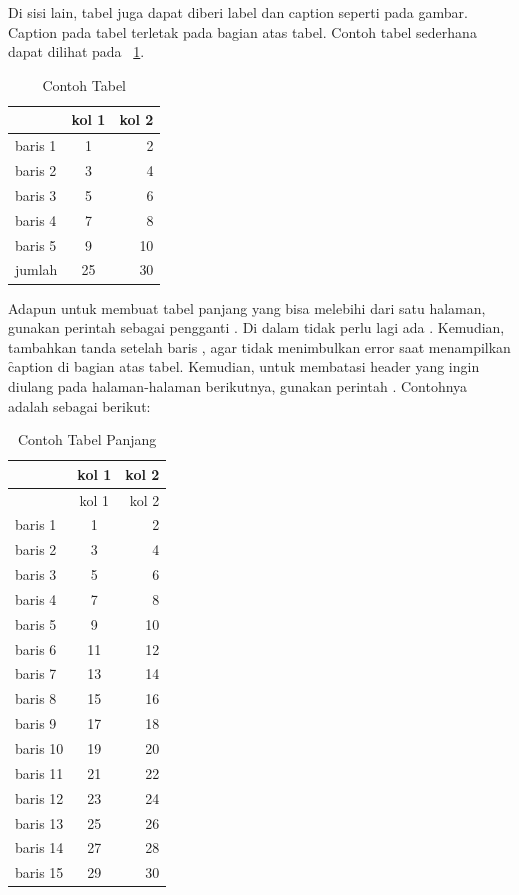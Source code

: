 Di sisi lain, tabel juga dapat diberi label dan caption seperti pada gambar.
Caption pada tabel terletak pada bagian atas tabel.
Contoh tabel sederhana dapat dilihat pada \tab~\ref{tab:tab1}.

\begin{table}
	\centering
	\caption{Contoh Tabel}
	\label{tab:tab1}
	\begin{tabular}{| l | c r |}
		\hline
		        & kol 1 & kol 2 \\
		\hline
		baris 1 & 1     & 2     \\
		baris 2 & 3     & 4     \\
		baris 3 & 5     & 6     \\
		baris 4 & 7     & 8     \\
		baris 5 & 9     & 10    \\
		\hline
		jumlah  & 25    & 30    \\
		\hline
	\end{tabular}
\end{table}

Adapun untuk membuat tabel panjang yang bisa melebihi dari satu halaman, gunakan perintah  sebagai pengganti . Di dalam  tidak perlu lagi ada . Kemudian, tambahkan tanda \code{\bslash{}\bslash{}} setelah baris , agar tidak menimbulkan error saat menampilkan \f{caption} di bagian atas tabel. Kemudian, untuk membatasi header yang ingin diulang pada halaman-halaman berikutnya, gunakan perintah . Contohnya adalah sebagai berikut:

\begin{longtable}{| l | c r |}
	\caption{Contoh Tabel Panjang}
	\label{tab:tab2}         \\
	\hline
	         & kol 1 & kol 2 \\
	\hline
	\endfirsthead %
	\hline
	         & kol 1 & kol 2 \\
	\hline
	\endhead %
	baris 1  & 1     & 2     \\
	baris 2  & 3     & 4     \\
	baris 3  & 5     & 6     \\
	baris 4  & 7     & 8     \\
	baris 5  & 9     & 10    \\
	baris 6  & 11    & 12    \\
	baris 7  & 13    & 14    \\
	baris 8  & 15    & 16    \\
	baris 9  & 17    & 18    \\
	baris 10 & 19    & 20    \\
	baris 11 & 21    & 22    \\
	baris 12 & 23    & 24    \\
	baris 13 & 25    & 26    \\
	baris 14 & 27    & 28    \\
	baris 15 & 29    & 30    \\
	\hline
\end{longtable}

